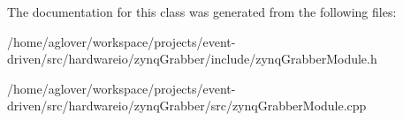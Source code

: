 The documentation for this class was generated from the following files\+:\begin{DoxyCompactItemize}
\item 
/home/aglover/workspace/projects/event-\/driven/src/hardwareio/zynq\+Grabber/include/zynq\+Grabber\+Module.\+h\item 
/home/aglover/workspace/projects/event-\/driven/src/hardwareio/zynq\+Grabber/src/zynq\+Grabber\+Module.\+cpp\end{DoxyCompactItemize}
